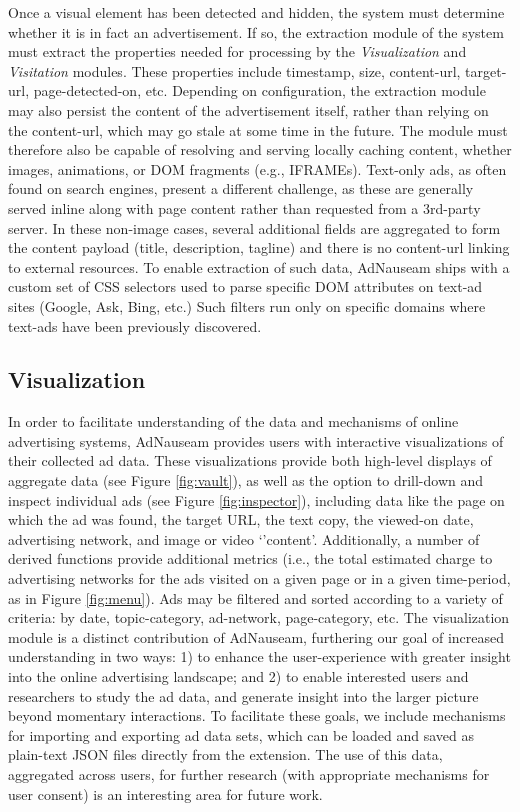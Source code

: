 \documentclass[conference]{IEEEtran}
\begin{document}
Once a visual element has been detected and hidden, the system must  determine whether it is in fact an advertisement. If so, the extraction module of the system must extract the properties needed for processing by the \emph{Visualization} and \emph{Visitation} modules. These properties include timestamp, size, content-url, target-url, page-detected-on, etc. Depending on configuration, the extraction module may also persist the content of the advertisement itself, rather than relying on the content-url, which may go stale at some time in the future. The module must therefore also be capable of resolving and serving locally caching content, whether images, animations, or DOM fragments (e.g., IFRAMEs). Text-only ads, as often found on search engines, present a different challenge, as these are generally served inline along with page content rather than requested from a 3rd-party server. In these non-image cases, several additional fields are aggregated to form the content payload (title, description, tagline) and there is no content-url linking to external resources. To enable extraction of such data, AdNauseam ships with a custom set of CSS selectors used to parse specific DOM attributes on text-ad sites (Google, Ask, Bing, etc.) Such filters run only on specific domains where text-ads have been previously discovered.

\subsection{Visualization}

In order to facilitate understanding of the data and mechanisms of online advertising systems, AdNauseam provides users with interactive visualizations of their collected ad data. These visualizations provide both high-level displays of aggregate data (see Figure \ref{fig:vault}), as well as the option to drill-down and inspect individual ads (see Figure \ref{fig:inspector}), including data like the page on which the ad was found, the target URL, the text copy, the viewed-on date, advertising network, and image or video `'content'. Additionally, a number of derived functions provide additional metrics (i.e., the total estimated charge to advertising networks for the ads visited on a given page or in a given time-period, as in Figure \ref{fig:menu}). Ads may be filtered and sorted according to a variety of criteria: by date, topic-category, ad-network, page-category, etc. The visualization module is a distinct contribution of AdNauseam, furthering our goal of increased understanding in two ways: 1) to enhance the user-experience with greater insight into the online advertising landscape; and 2) to enable interested users and researchers to study the ad data, and generate insight into the larger picture beyond momentary interactions. To facilitate these goals, we include mechanisms for importing and exporting ad data sets, which can be loaded and saved as plain-text JSON files directly from the extension. The use of this data, aggregated across users, for further research (with appropriate mechanisms for user consent) is an interesting area for future work.
\end{document}
